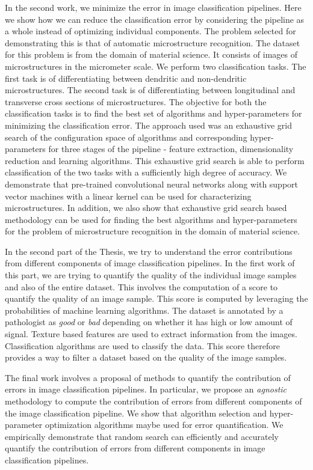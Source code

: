 In the second work, we minimize the error in image classification pipelines. Here we show how we can reduce the classification error by considering the pipeline as a whole instead of optimizing individual components. The problem selected for demonstrating this is that of automatic microstructure recognition. The dataset for this problem is from the domain of material science. It consists of images of microstructures in the micrometer scale. We perform two classification tasks. The first task is of differentiating between dendritic and non-dendritic microstructures. The second task is of differentiating between longitudinal and transverse cross sections of microstructures. The objective for both the classification tasks is to find the best set of algorithms and hyper-parameters for minimizing the classification error. The approach used was an exhaustive grid search of the configuration space of algorithms and corresponding hyper-parameters for three stages of the pipeline - feature extraction, dimensionality reduction and learning algorithms. This exhaustive grid search is able to perform classification of the two tasks with a sufficiently high degree of accuracy. We demonstrate that pre-trained convolutional neural networks along with support vector machines with a linear kernel can be used for characterizing microstructures. In addition, we also show that exhaustive grid search based methodology can be used for finding the best algorithms and hyper-parameters for the problem of microstructure recognition in the domain of material science.

In the second part of the Thesis, we try to understand the  error contributions from different components of  image classification pipelines. In the first work of this part, we are trying to quantify the quality of the individual image samples and also of the  entire dataset. This involves the computation of a score to quantify the quality of an image sample. This score is computed by leveraging the probabilities of machine learning algorithms. The dataset is annotated by a pathologist as \textit{good} or \textit{bad} depending on whether it has high or low amount of signal. Texture based features are used to extract information from the images. Classification algorithms are used to classify the data. This score therefore provides a way to filter a dataset based on the quality of the image samples.

The final work involves a proposal of methods to quantify the contribution of errors in image classification pipelines. In particular, we propose an \textit{agnostic} methodology to compute the contribution of errors from different components of the image classification pipeline.  We show that algorithm selection and hyper-parameter optimization algorithms maybe used for error quantification. We empirically demonstrate that random search can efficiently and accurately quantify the contribution of errors from different components  in image classification pipelines.


